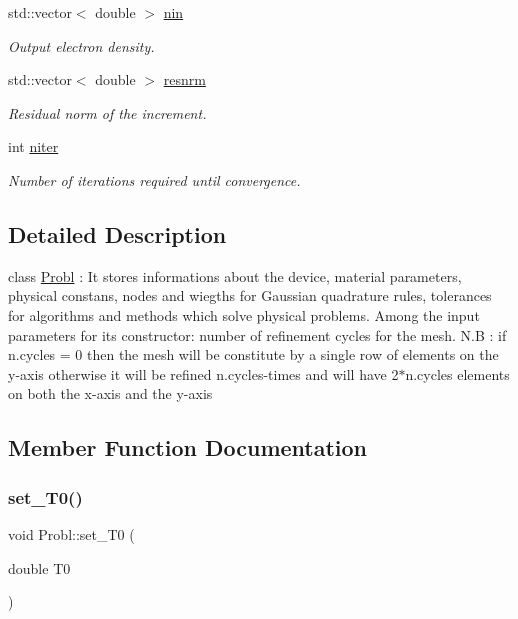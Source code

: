 \begin{DoxyCompactItemize}
std\+::vector$<$ double $>$ \mbox{\hyperlink{class_probl_a398affcfb0a2ac6033866f5c6a2d3d27}{nin}}
\begin{DoxyCompactList}\small\item\em Output electron density. \end{DoxyCompactList}\item 
\mbox{\label{class_probl_a8366d5132536de44debdda93a930a4cc}} 
std\+::vector$<$ double $>$ \mbox{\hyperlink{class_probl_a8366d5132536de44debdda93a930a4cc}{resnrm}}
\begin{DoxyCompactList}\small\item\em Residual norm of the increment. \end{DoxyCompactList}\item 
\mbox{\label{class_probl_a316f343116c835fc18e95aeec2f87407}} 
int \mbox{\hyperlink{class_probl_a316f343116c835fc18e95aeec2f87407}{niter}}
\begin{DoxyCompactList}\small\item\em Number of iterations required until convergence. \end{DoxyCompactList}\end{DoxyCompactItemize}


\subsection{Detailed Description}
class \mbox{\hyperlink{class_probl}{Probl}} \+: It stores informations about the device, material parameters, physical constans, nodes and wiegths for Gaussian quadrature rules, tolerances for algorithms and methods which solve physical problems. Among the input parameters for its constructor\+: number of refinement cycles for the mesh. N.\+B \+: if n.\+cycles = 0 then the mesh will be constitute by a single row of elements on the y-\/axis otherwise it will be refined n.\+cycles-\/times and will have 2$\ast$n.cycles elements on both the x-\/axis and the y-\/axis 

\subsection{Member Function Documentation}
\mbox{\label{class_probl_a015de30e9e1847638ec206b7d0341d8a}} 
\subsubsection{\texorpdfstring{set\+\_\+\+T0()}{set\_T0()}}
{\footnotesize\ttfamily void Probl\+::set\+\_\+\+T0 (\begin{DoxyParamCaption}\item[{double}]{T0 }\end{DoxyParamCaption})}



